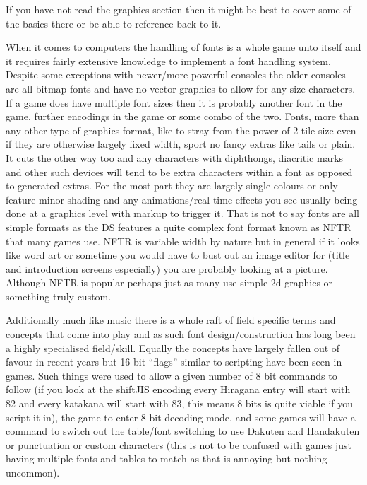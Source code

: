 \documentclass[
]{book}
\begin{document}
If you have not read the graphics section then it might be best to cover some of the basics there or be able to reference back to it.

When it comes to computers the handling of fonts is a whole game unto itself and it requires fairly extensive knowledge to implement a font handling system. Despite some exceptions with newer/more powerful consoles the older consoles are all bitmap fonts and have no vector graphics to allow for any size characters. If a game does have multiple font sizes then it is probably another font in the game, further encodings in the game or some combo of the two. Fonts, more than any other type of graphics format, like to stray from the power of 2 tile size even if they are otherwise largely fixed width, sport no fancy extras like tails or plain. It cuts the other way too and any characters with diphthongs, diacritic marks and other such devices will tend to be extra characters within a font as opposed to generated extras. For the most part they are largely single colours or only feature minor shading and any animations/real time effects you see usually being done at a graphics level with markup to trigger it. That is not to say fonts are all simple formats as the DS features a quite complex font format known as NFTR that many games use. NFTR is variable width by nature but in general if it looks like word art or sometime you would have to bust out an image editor for (title and introduction screens especially) you are probably looking at a picture. Although NFTR is popular perhaps just as many use simple 2d graphics or something truly custom.

Additionally much like music there is a whole raft of \href{http://www.fontshop.com/glossary/}{field specific terms and concepts} that come into play and as such font design/construction has long been a highly specialised field/skill. Equally the concepts have largely fallen out of favour in recent years but 16 bit ``flags'' similar to scripting have been seen in games. Such things were used to allow a given number of 8 bit commands to follow (if you look at the shiftJIS encoding every Hiragana entry will start with 82 and every katakana will start with 83, this means 8 bits is quite viable if you script it in), the game to enter 8 bit decoding mode, and some games will have a command to switch out the table/font switching to use Dakuten and Handakuten or punctuation or custom characters (this is not to be confused with games just having multiple fonts and tables to match as that is annoying but nothing uncommon).
\end{document}
